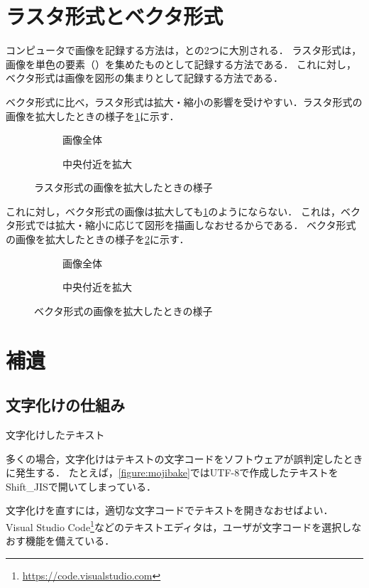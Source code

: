 \documentclass[../../index]{subfiles}
\begin{document}
\section{ラスタ形式とベクタ形式}
コンピュータで画像を記録する方法は，との2つに大別される．
ラスタ形式は，画像を単色の要素（）を集めたものとして記録する方法である．
これに対し，ベクタ形式は画像を図形の集まりとして記録する方法である．

ベクタ形式に比べ，ラスタ形式は拡大・縮小の影響を受けやすい．ラスタ形式の画像を拡大したときの様子を\cref{figure:raster_scaling}に示す．

\begin{figure}[htb]
  \begin{subfigure}{0.5\linewidth}
    \centering
    \caption{画像全体}
  \end{subfigure}%
  \begin{subfigure}{0.5\linewidth}
    \centering
    \caption{中央付近を拡大}
  \end{subfigure}
  \caption{ラスタ形式の画像を拡大したときの様子}
  \label{figure:raster_scaling}
\end{figure}

これに対し，ベクタ形式の画像は拡大しても\cref{figure:raster_scaling}のようにならない．
これは，ベクタ形式では拡大・縮小に応じて図形を描画しなおせるからである．
ベクタ形式の画像を拡大したときの様子を\cref{figure:vector_scaling}に示す．

\begin{figure}[htb]
  \begin{subfigure}{0.5\linewidth}
    \centering
    \caption{画像全体}
  \end{subfigure}%
  \begin{subfigure}{0.5\linewidth}
    \centering
    \caption{中央付近を拡大}
  \end{subfigure}
  \caption{ベクタ形式の画像を拡大したときの様子}
  \label{figure:vector_scaling}
\end{figure}

\section{補遺}
\subsection{文字化けの仕組み}
\begin{floatingfigure}{5cm}
  \centering
  \caption{文字化けしたテキスト}
  \label{figure:mojibake}
\end{floatingfigure}

多くの場合，文字化けはテキストの文字コードをソフトウェアが誤判定したときに発生する．
たとえば，\cref{figure:mojibake}ではUTF-8で作成したテキストをShift\_JISで開いてしまっている．

文字化けを直すには，適切な文字コードでテキストを開きなおせばよい．
Visual Studio Code\footnote{\url{https://code.visualstudio.com}}などのテキストエディタは，ユーザが文字コードを選択しなおす機能を備えている．
\end{document}
